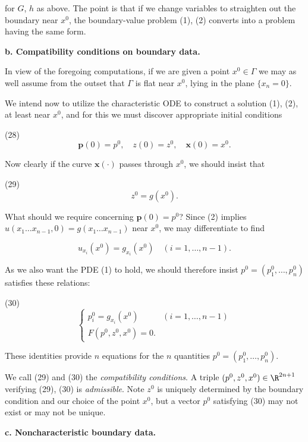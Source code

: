 for $G$, $h$ as above. The point is that if we change variables to straighten out the boundary near $x^0$, the boundary-value problem (1), (2) converts into a problem having the same form.

\textbf{b. Compatibility conditions on boundary data.}

In view of the foregoing computations, if we are given a point $x^0 \in \Gamma$ we may as well assume from the outset that $\Gamma$ is flat near $x^0$, lying in the plane $\{x_n = 0\}$.

We intend now to utilize the characteristic ODE to construct a solution (1), (2), at least near $x^0$, and for this we must discover appropriate initial conditions

(28) $$\mathbf{p}(0) = p^0, \quad z(0) = z^0, \quad \mathbf{x}(0) = x^0.$$

Now clearly if the curve $\mathbf{x}(\cdot)$ passes through $x^0$, we should insist that

(29) $$z^0 = g(x^0).$$

What should we require concerning $\mathbf{p}(0) = p^0$? Since (2) implies $u(x_1 \ldots x_{n-1}, 0) = g(x_1 \ldots x_{n-1})$ near $x^0$, we may differentiate to find

$$u_{x_i}(x^0) = g_{x_i}(x^0) \quad (i = 1, \ldots, n-1).$$

As we also want the PDE (1) to hold, we should therefore insist $p^0 = (p_1^0, \ldots, p_n^0)$ satisfies these relations:

(30) $$\begin{cases} p_i^0 = g_{x_i}(x^0) & (i = 1,\ldots,n-1) \\ F(p^0, z^0, x^0) = 0. \end{cases}$$

These identities provide $n$ equations for the $n$ quantities $p^0 = (p_1^0, \ldots, p_n^0)$.

\begin{definition}
\label{def:compatibility-conditions-admissible-triple}
We call (29) and (30) the \textit{compatibility conditions}. A triple $(p^0, z^0, x^0) \in \R^{2n+1}$ verifying (29), (30) is \textit{admissible}. Note $z^0$ is uniquely determined by the boundary condition and our choice of the point $x^0$, but a vector $p^0$ satisfying (30) may not exist or may not be unique.
\end{definition}

\textbf{c. Noncharacteristic boundary data.}

